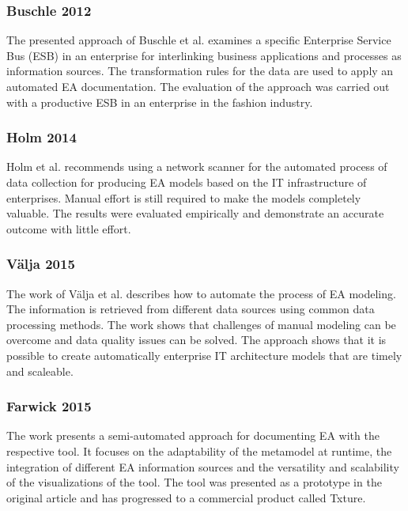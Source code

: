 \subsubsection{Buschle  2012}
The presented approach of Buschle et al. \cite{Buschle2012} examines a specific Enterprise Service Bus (ESB) in an enterprise for interlinking business applications and processes as information sources. The transformation rules for the data are used to apply an automated EA documentation. The evaluation of the approach was carried out with a productive ESB in an enterprise in the fashion industry. 

\subsubsection{Holm  2014}
Holm et al. \cite{Holm2014} recommends using a network scanner for the automated process of data collection for producing EA models based on the IT infrastructure of enterprises. Manual effort is still required to make the models completely valuable. The results were evaluated empirically and demonstrate an accurate outcome with little effort.

\subsubsection{Välja 2015}
The work of Välja et al. \cite{Valja2015} describes how to automate the process of EA modeling. The information is retrieved from different data sources using common data processing methods. The work shows that challenges of manual modeling can be overcome and data quality issues can be solved. The approach shows that it is possible to create automatically enterprise IT architecture models that are timely and scaleable. \cite{Valja2015}

\subsubsection{Farwick 2015}
The work presents a semi-automated approach for documenting EA with the respective tool. It focuses on the adaptability of the metamodel at runtime, the integration of different EA information sources and the versatility and scalability of the visualizations of the tool. The tool was presented as a prototype in the original article and has progressed to a commercial product called Txture.\cite{Farwick2015a}

